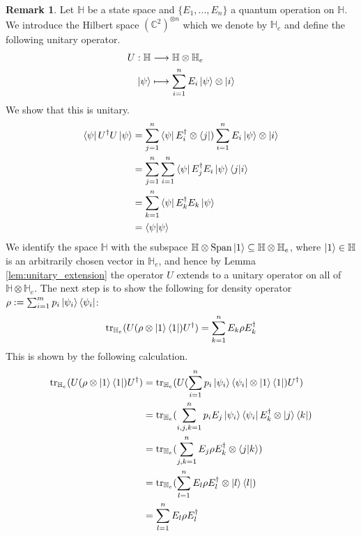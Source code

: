 \documentclass[12pt]{article}
\theoremstyle{plain}
\theoremstyle{definition}
\newtheorem{remark}[thm]{Remark}
\newcommand{\bb}[1]{\mathbb{#1}}
\newcommand{\lto}{\longrightarrow}
\begin{document}
	\begin{remark}
		Let $\bb{H}$ be a state space and $\lbrace E_1,...,E_n\rbrace$ a quantum operation on $\bb{H}$. We introduce the Hilbert space $(\bb{C}^2)^{\otimes n}$ which we denote by $\bb{H}_e$ and define the following unitary operator.
		\begin{align}
			U: \bb{H}&\lto \bb{H} \otimes \bb{H}_e\\
			\ket{\psi} &\longmapsto \sum_{i = 1}^n E_i \ket{\psi} \otimes \ket{i}
		\end{align}
	We show that this is unitary.
	\begin{align*}
		\bra{\psi} U^\dagger U \ket{\psi} &= \sum_{j = 1}^n \bra{\psi} E_i^\dagger \otimes \bra{j})\sum_{i = 1}^n E_i \ket{\psi} \otimes \ket{i}\\
		&= \sum_{j = 1}^n \sum_{i= 1}^n \bra{\psi}E_j^\dagger E_i \ket{\psi} \bra{j}\ket{i}\\
		&= \sum_{k = 1}^n \bra{\psi} E_k^\dagger E_k \ket{\psi}\\
		&= \bra{\psi}\ket{\psi}
	\end{align*}
We identify the space $\bb{H}$ with the subspace $\bb{H} \otimes \operatorname{Span}\ket{1} \subseteq \bb{H} \otimes \bb{H}_e$, where $\ket{1} \in \bb{H}$ is an arbitrarily chosen vector in $\bb{H}_e$, and hence by Lemma \ref{lem:unitary_extension} the operator $U$ extends to a unitary operator on all of $\bb{H} \otimes \bb{H}_e$. The next step is to show the following for density operator $\rho := \sum_{i = 1}^m p_i \ket{\psi_i}\bra{\psi_i}$:
\begin{equation}
	\operatorname{tr}_{\bb{H}_e}(U(\rho \otimes \ket{1}\bra{1})U^\dagger) = \sum_{k = 1}^n E_k \rho E_k^\dagger
\end{equation}
This is shown by the following calculation.
\begin{align*}
	\operatorname{tr}_{\bb{H}_e}(U(\rho \otimes \ket{1}\bra{1})U^\dagger) &= \operatorname{tr}_{\bb{H}_e}(U (\sum_{i = 1}^n p_i \ket{\psi_i}\bra{\psi_i} \otimes \ket{1}\bra{1})U^\dagger)\\
	&= \operatorname{tr}_{\bb{H}_e}(\sum_{i,j,k = 1}^n p_i E_j \ket{\psi_i}\bra{\psi_i}E_k^\dagger \otimes \ket{j}\bra{k})\\
	&= \operatorname{tr}_{\bb{H}_e}(\sum_{j,k = 1}^n E_j \rho E_k^\dagger \otimes \bra{j}\ket{k})\\
	&= \operatorname{tr}_{\bb{H}_e}(\sum_{l = 1}^n E_l \rho E_l^\dagger \otimes \ket{l}\bra{l})\\
	&= \sum_{l = 1}^n E_l \rho E_l^\dagger
\end{align*}
	\end{remark}
	
\end{document}
